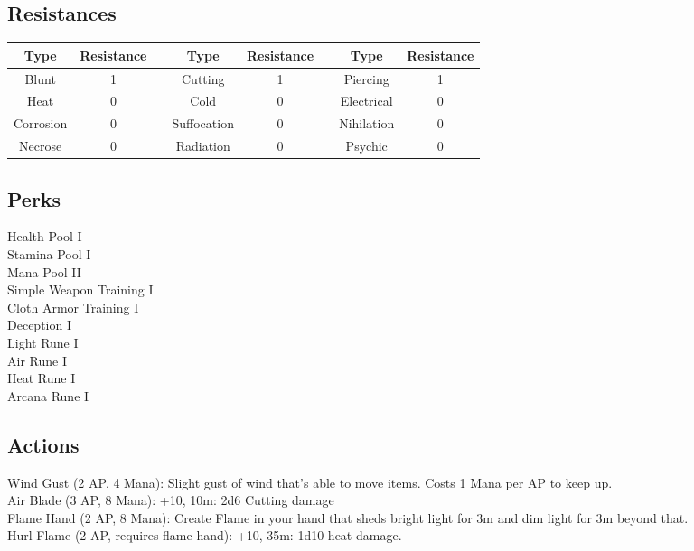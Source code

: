\subsection{Resistances}
\begin{minipage}[H]{1\textwidth}
	\centering
	\begin{tabular}[c]{|c | c | c | c | c | c | c | c|}
		\hline
		Type & Resistance && Type & Resistance && Type & Resistance\\
		\hline
		Blunt & 1 &&
		Cutting & 1 &&
		Piercing & 1\\
		Heat & 0 &&
		Cold & 0 &&
		Electrical & 0\\
		Corrosion & 0 &&
		Suffocation & 0 &&
		Nihilation & 0 \\
		Necrose & 0 &&
		Radiation & 0 &&
		Psychic & 0\\
		\hline
	\end{tabular}
\end{minipage}

\subsection{Perks}
Health Pool I\\
Stamina Pool I\\
Mana Pool II\\
Simple Weapon Training I\\
Cloth Armor Training I\\
Deception I\\
Light Rune I\\
Air Rune I\\
Heat Rune I\\
Arcana Rune I\\

\subsection{Actions}
Wind Gust (2 AP, 4 Mana): Slight gust of wind that's able to move items.
Costs 1 Mana per AP to keep up.\\

Air Blade (3 AP, 8 Mana): +10, 10m: 2d6 Cutting damage\\

Flame Hand (2 AP, 8 Mana): Create Flame in your hand that sheds bright light for 3m and dim light for 3m beyond that.\\

Hurl Flame (2 AP, requires flame hand): +10, 35m: 1d10 heat damage.\\

